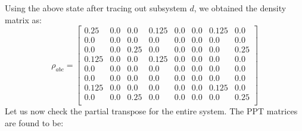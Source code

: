 \documentclass{scrartcl}
\begin{document}
Using the above state after tracing out subsystem $d$, we obtained the density matrix as:
\begin{equation}
    \rho_{abc}=
    \left[
    \begin{array}{cccccccc}
    0.25 & 0.0 & 0.0 & 0.125 & 0.0 & 0.0 & 0.125 & 0.0 \\
    0.0 & 0.0 & 0.0 & 0.0 & 0.0 & 0.0 & 0.0 & 0.0 \\
    0.0 & 0.0 & 0.25 & 0.0 & 0.0 & 0.0 & 0.0 & 0.25 \\
    0.125 & 0.0 & 0.0 & 0.125 & 0.0 & 0.0 & 0.0 & 0.0 \\
    0.0 & 0.0 & 0.0 & 0.0 & 0.0 & 0.0 & 0.0 & 0.0 \\
    0.0 & 0.0 & 0.0 & 0.0 & 0.0 & 0.0 & 0.0 & 0.0 \\
    0.125 & 0.0 & 0.0 & 0.0 & 0.0 & 0.0 & 0.125 & 0.0 \\
    0.0 & 0.0 & 0.25 & 0.0 & 0.0 & 0.0 & 0.0 & 0.25 \\
    \end{array}
    \right]
    \end{equation}
    Let us now check the partial transpose for the entire system. The PPT matrices are found to be:\\
\end{document}
